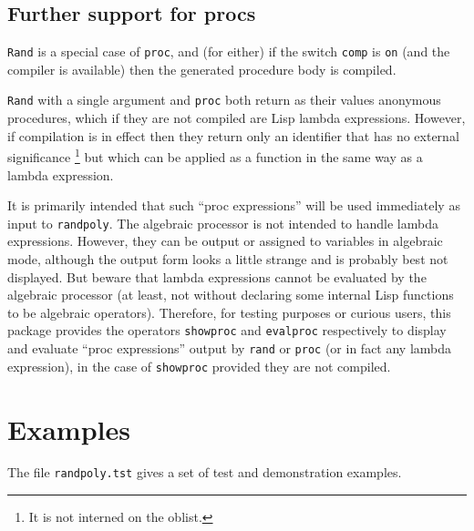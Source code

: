 \subsection{Further support for procs}

{\tt Rand} is a special case of {\tt proc}, and (for either) if the
switch {\tt comp} is {\tt on} (and the compiler is available) then the
generated procedure body is compiled.

{\tt Rand} with a single argument and {\tt proc} both return as their
values anonymous procedures, which if they are not compiled are Lisp
lambda expressions.  However, if compilation is in effect then they
return only an identifier that has no external significance%
\footnote{It is not interned on the oblist.} %
but which can be applied as a function in the same way as a lambda
expression.

It is primarily intended that such ``proc expressions'' will be used
immediately as input to {\tt randpoly}.  The algebraic processor is
not intended to handle lambda expressions.  However, they can be
output or assigned to variables in algebraic mode, although the output
form looks a little strange and is probably best not displayed.  But
beware that lambda expressions cannot be evaluated by the algebraic
processor (at least, not without declaring some internal Lisp
functions to be algebraic operators).  Therefore, for testing purposes
or curious users, this package provides the operators {\tt showproc}
and {\tt evalproc} respectively to display and evaluate ``proc
expressions'' output by {\tt rand} or {\tt proc} (or in fact any
lambda expression), in the case of {\tt showproc} provided they are
not compiled.


\section{Examples}
\label{sec:Examples}

The file {\tt randpoly.tst} gives a set of test and demonstration
examples.

